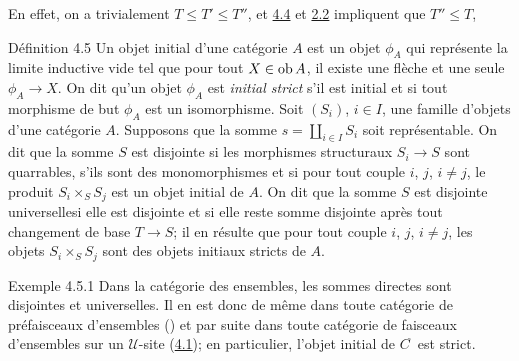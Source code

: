\documentclass[10pt]{../fichiers-configuration-latex/smfart}
\begin{document}
En effet, on a trivialement $T\leq T'\leq T''$, et \hyperref[II.theo4.4]{4.4}
et \hyperref[II.prop2.2]{2.2} impliquent que $T''\leq T$, \cqfd

\begin{enonce*}{Définition 4.5}
Un objet initial d'une catégorie $A$ est un objet $\phi_A$ qui
représente la limite inductive vide \ie tel que pour tout $X\in
\operatorname{ob} A$, il existe une flèche et une seule $\phi_A\rightarrow X$. On
dit qu'un objet $\phi_A$ est \emph{initial strict} s'il est initial
et si tout morphisme de but $\phi_{A}$ est un isomorphisme. Soit
$(S_i)$, $i\in I$, une famille d'objets d'une catégorie $A$.
Supposons que la somme $s=\amalg_{i\in I} S_i$ soit représentable.
On dit que la somme $S$ est disjointe si les morphismes structuraux
$S_i\rightarrow S$ sont quarrables, s'ils sont des monomorphismes et
si pour tout couple $i$, $j$, $i\neq j$, le produit $S_i\times_S
S_j$ est un objet initial de $A$. On dit que la somme $S$ est
disjointe universelle\pageoriginale si elle est disjointe et si elle
reste somme disjointe après tout changement de base $T\rightarrow
S$; il en résulte que pour tout couple $i$, $j$, $i\neq j$, les
objets $S_i\times_S S_j$ sont des objets initiaux stricts de $A$.
\end{enonce*}

\begin{enonce*}[remark]{Exemple 4.5.1}
Dans la catégorie des ensembles, les sommes directes sont
disjointes et universelles. Il en est donc de même dans toute
catégorie de préfaisceaux d'ensembles () et par
suite dans toute catégorie de faisceaux d'ensembles sur un
$𝒰$-site (\hyperref[II.theo4.1]{4.1}); en particulier, l'objet initial
de $C^{\widetilde{\phantom{,}}}$ est strict.
\end{enonce*}
\end{document}
